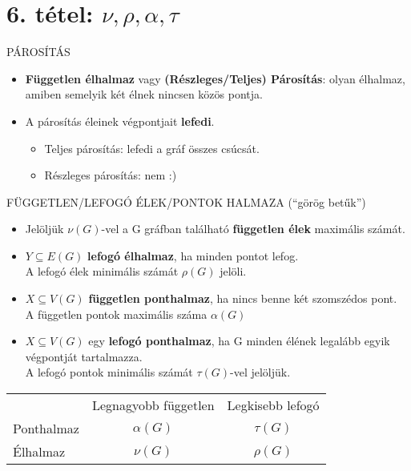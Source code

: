 \section{6. tétel: $\nu, \rho, \alpha, \tau$}

\label{sec:parositas}
\begin{definicio}{PÁROSÍTÁS}
  \begin{itemize}
  \item \textbf{Független élhalmaz} vagy \textbf{(Részleges/Teljes) Párosítás}: olyan élhalmaz, amiben semelyik két élnek nincsen közös pontja.
  \item A párosítás éleinek végpontjait \textbf{lefedi}.
    \begin{itemize}
    \item Teljes párosítás: lefedi a gráf összes csúcsát.
    \item Részleges párosítás: nem :)
    \end{itemize}
  \end{itemize}
\end{definicio}

\begin{definicio}{FÜGGETLEN/LEFOGÓ ÉLEK/PONTOK HALMAZA (``görög betűk'')}
  \begin{itemize}
  \item Jelöljük $\nu(G)$-vel a G gráfban található \textbf{független élek} maximális számát.
  \item $Y \subseteq E(G)$ \textbf{lefogó élhalmaz}, ha minden pontot lefog.\\
    A lefogó élek minimális számát $\rho(G)$ jelöli.
  \item $X \subseteq V(G)$ \textbf{független ponthalmaz}, ha nincs benne két szomszédos pont.\\
    A független pontok maximális száma $\alpha(G)$
  \item $X \subseteq V(G)$ egy \textbf{lefogó ponthalmaz}, ha G minden élének legalább egyik végpontját tartalmazza.\\
    A lefogó pontok minimális számát $\tau(G)$-vel jelöljük.
  \end{itemize}
\begin{center}
  \begin{tabular}{l c c}
    & Legnagyobb független & Legkisebb lefogó\\
    Ponthalmaz & $\alpha(G)$ & $\tau(G)$\\
    Élhalmaz & $\nu(G)$ & $\rho(G)$
  \end{tabular}
\end{center}
\end{definicio}


